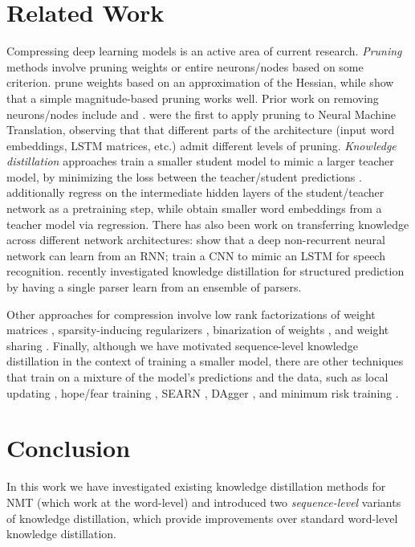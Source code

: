\documentclass[11pt,letterpaper]{article}
\begin{document}
\section{Related Work}
Compressing deep learning models is an active area of current research.
\textit{Pruning} methods involve pruning weights or entire neurons/nodes based on
some criterion.  prune weights
based on an approximation of the Hessian, while  show that a simple
magnitude-based pruning works well. Prior work on removing neurons/nodes include  
and .  were the first to apply pruning  
 to Neural Machine Translation,
observing that that different parts of the architecture 
(input word embeddings, LSTM matrices, etc.) admit different
levels of pruning.
\textit{Knowledge distillation} approaches train a smaller student model to mimic a larger teacher model, by minimizing 
the loss between the teacher/student predictions \cite{Bucila2006,Ba2014,Li2014,Hinton2015}.
 additionally regress on the intermediate hidden layers of the student/teacher
network as a pretraining step, while  obtain smaller word embeddings from a teacher model via regression.
There has also been work on transferring knowledge across different network 
architectures:   show that a 
deep non-recurrent neural network can learn from an RNN; 
train a CNN to mimic an LSTM for speech recognition.  recently investigated
knowledge distillation for structured prediction by having a single parser learn
from an ensemble of parsers.

Other approaches for compression involve low rank factorizations of weight matrices \cite{Denton2014,Jaderberg2014,Lu2016,Prabhavalkar2016},
sparsity-inducing regularizers \cite{Murray2015}, binarization of weights \cite{Courbariaux2016,Lin2016},
and weight sharing \cite{Chen2015b,Han2016}. 
Finally, although we have motivated sequence-level knowledge distillation in the context of training a smaller model,
there are other techniques that train on a mixture of the model's predictions and the data, such as 
local updating \cite{Liang2006}, hope/fear training \cite{Chiang2012}, SEARN \cite{Daume2009},
DAgger \cite{Ross2011}, and minimum risk training \cite{Och2003,Shen2016}.

\section{Conclusion}
In this work we have investigated existing knowledge distillation methods for NMT (which work at the
word-level) and
introduced two \textit{sequence-level} variants of knowledge distillation, which provide
improvements over standard word-level knowledge distillation.
\end{document}

